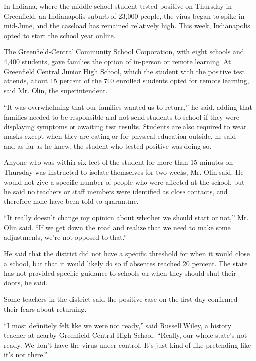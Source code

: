 In Indiana, where the middle school student tested positive on Thursday
in Greenfield, an Indianapolis suburb of 23,000 people, the virus began
to spike in mid-June, and the caseload has remained relatively high.
This week, Indianapolis opted to start the school year online.

The Greenfield-Central Community School Corporation, with eight schools
and 4,400 students, gave families
\href{https://www.gcsc.k12.in.us/wp-content/uploads/2020/07/Greenfield-Central-School-Opening-Procedures-Final-7-8-2020.pdf}{the
option of in-person or remote learning}. At Greenfield Central Junior
High School, which the student with the positive test attends, about 15
percent of the 700 enrolled students opted for remote learning, said Mr.
Olin, the superintendent.

``It was overwhelming that our families wanted us to return,'' he said,
adding that families needed to be responsible and not send students to
school if they were displaying symptoms or awaiting test results.
Students are also required to wear masks except when they are eating or
for physical education outside, he said --- and as far as he knew, the
student who tested positive was doing so.

Anyone who was within six feet of the student for more than 15 minutes
on Thursday was instructed to isolate themselves for two weeks, Mr. Olin
said. He would not give a specific number of people who were affected at
the school, but he said no teachers or staff members were identified as
close contacts, and therefore none have been told to quarantine.

``It really doesn't change my opinion about whether we should start or
not,'' Mr. Olin said. ``If we get down the road and realize that we need
to make some adjustments, we're not opposed to that.''

He said that the district did not have a specific threshold for when it
would close a school, but that it would likely do so if absences reached
20 percent. The state has not provided specific guidance to schools on
when they should shut their doors, he said.

Some teachers in the district said the positive case on the first day
confirmed their fears about returning.

``I most definitely felt like we were not ready,'' said Russell Wiley, a
history teacher at nearby Greenfield-Central High School. ``Really, our
whole state's not ready. We don't have the virus under control. It's
just kind of like pretending like it's not there.''

